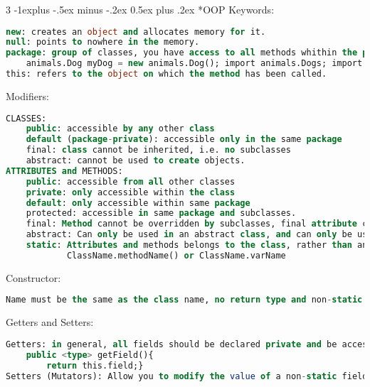 \documentclass[10pt,landscape]{article}
\makeatletter
\renewcommand{\subsection}{\@startsection{subsection}{2}{0mm}%
                                {-1explus -.5ex minus -.2ex}%
                                {0.5ex plus .2ex}%
                                {\normalfont\normalsize\bfseries}}
\makeatother
\begin{document}
\begin{multicols}{3}
\subsection*{OOP}
Keywords:
\begin{lstlisting}[language=SQL]
new: creates an object and allocates memory for it. 
null: points to nowhere in the memory. 
package: group of classes, you have access to all methods whithin the package. If method is from another package:
    animals.Dog myDog = new animals.Dog(); import animals.Dogs; import animals.*;
this: refers to the object on which the method has been called. 
\end{lstlisting}
Modifiers:
\begin{lstlisting}[language=SQL]
CLASSES: 
    public: accessible by any other class
    default (package-private): accessible only in the same package 
    final: class cannot be inherited, i.e. no subclasses
    abstract: cannot be used to create objects. 
ATTRIBUTES and METHODS:
    public: accessible from all other classes
    private: only accessible within the class
    default: only accessible within same package
    protected: accessible in same package and subclasses. 
    final: Method cannot be overridden by subclasses, final attribute can only be initialized once. If the object the attribute refers to is mutable, we can change it freely, but it must stay the same obj. A final non-static field must be initialized in every constructor. A final static field must be initialized on the same line of the declaration.
    abstract: Can only be used in an abstract class, and can only be used on methods, does not have a body and must be overriden in subclass.
    static: Attributes and methods belongs to the class, rather than an object. Static methods are used to perform operations that are not dependent upon instance creation
            ClassName.methodName() or ClassName.varName 
\end{lstlisting}
Constructor:
\begin{lstlisting}[language=SQL]
Name must be the same as the class name, no return type and non-static. The default constructor takes no argument and has an empty body, you lose access to it as soon as you declare your own constructor. 
\end{lstlisting}
Getters and Setters: 
\begin{lstlisting}[language=SQL]
Getters: in general, all fields should be declared private and be accessed with a getter:
    public <type> getField(){
        return this.field;}
Setters (Mutators): Allow you to modify the value of a non-static field.

\end{lstlisting}
\end{multicols}
\end{document}
